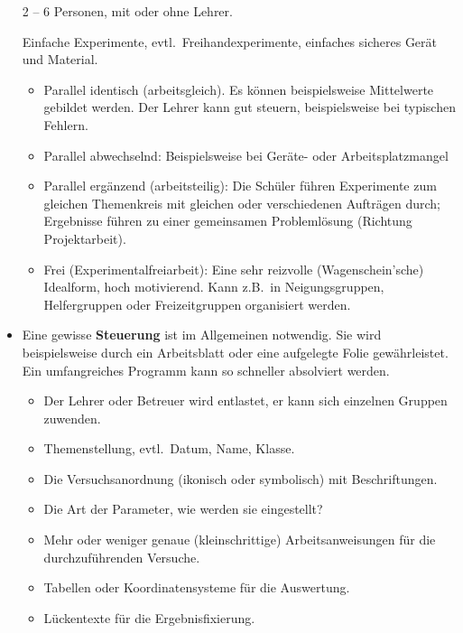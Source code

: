 \begin{itemize}
	 2 -- 6 Personen, mit oder ohne Lehrer.
	
	 Einfache Experimente, evtl.\ Freihandexperimente,
	einfaches sicheres Ger\"{a}t und Material.
	\begin{itemize}
		\item
		Parallel identisch (arbeitsgleich).
		Es k\"{o}nnen beispielsweise Mittelwerte gebildet werden.
		Der Lehrer kann gut steuern, beispielsweise bei typischen Fehlern.
		\item
		Parallel abwechselnd:
		Beispielsweise bei Ger\"{a}te- oder Arbeitsplatzmangel
		\item
		Parallel erg\"{a}nzend (arbeitsteilig):
		Die Sch\"{u}ler f\"{u}hren Experimente zum gleichen Themenkreis mit
		gleichen oder verschiedenen Auftr\"{a}gen durch;
		Ergebnisse f\"{u}hren zu einer gemeinsamen Probleml\"{o}sung
		(Richtung Projektarbeit).
		\item
		Frei (Experimentalfreiarbeit):
		Eine sehr reizvolle (Wagenschein'sche) Idealform, hoch motivierend.
		Kann z.B.\ in Neigungsgruppen, Helfergruppen oder
		Freizeitgruppen organisiert werden.
	
	\end{itemize}
	
	\item
	Eine gewisse \textbf{Steuerung} ist im Allgemeinen notwendig.
	Sie wird beispielsweise durch ein Arbeitsblatt oder eine
	aufgelegte Folie gew\"{a}hrleistet.
	Ein umfangreiches Programm kann so schneller absolviert werden.
	
	
	\begin{itemize}
		\item
		Der Lehrer oder Betreuer wird entlastet, er kann sich
		einzelnen Gruppen zuwenden.
		\item
		Themenstellung, evtl.\ Datum, Name, Klasse.
		\item
		Die Versuchsanordnung (ikonisch oder symbolisch)
		mit Beschriftungen.
		\item
		Die Art der Parameter, wie werden sie eingestellt?
		\item
		Mehr oder weniger genaue (kleinschrittige) Arbeitsanweisungen
		f\"{u}r die durchzuf\"{u}hrenden Versuche.
		\item
		Tabellen oder Koordinatensysteme f\"{u}r die Auswertung.
		\item
		L\"{u}ckentexte f\"{u}r die Ergebnisfixierung.
	

\end{itemize}
\end{itemize}
